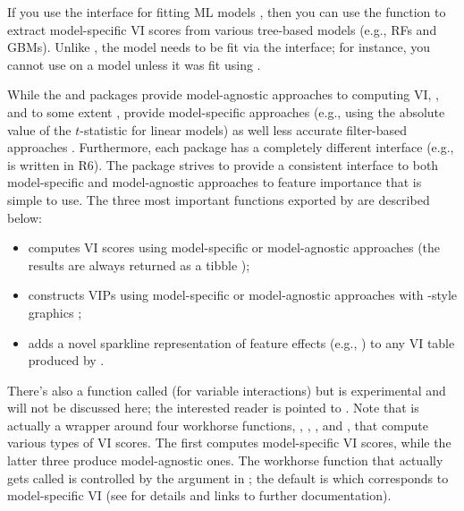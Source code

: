If you use the  interface for fitting ML models \citep{mlr-pkg}, then you can use the  function to extract model-specific VI scores from various tree-based models (e.g., RFs and GBMs). Unlike , the model needs to be fit via the  interface; for instance, you cannot use  on a  model \citep{gbm-pkg} unless it was fit using .

While the  and  packages provide model-agnostic approaches to computing VI, , and to some extent , provide model-specific approaches (e.g., using the absolute value of the $t$-statistic for linear models) as well less accurate filter-based approaches . Furthermore, each package has a completely different interface (e.g.,  is written in R6). The  package \citep{vip-pkg} strives to provide a consistent interface to both model-specific and model-agnostic approaches to feature importance that is simple to use. The three most important functions exported by  are described below:

\begin{itemize}
 
  \item {} computes VI scores using model-specific or model-agnostic approaches (the results are always returned as a tibble \citep{tibble-pkg});
  
  \item {} constructs VIPs using model-specific or model-agnostic approaches with -style graphics \citep{ggplot2-pkg};
  
  \item {} adds a novel sparkline representation of feature effects (e.g., ) to any VI table produced by .

\end{itemize}

There's also a function called  (for variable interactions) but is experimental and will not be discussed here; the interested reader is pointed to \citet{greenwell-simple-2018}. Note that  is actually a wrapper around four workhorse functions, , , , and , that compute various types of VI scores. The first computes model-specific VI scores, while the latter three produce model-agnostic ones. The workhorse function that actually gets called is controlled by the  argument in ; the default is  which corresponds to model-specific VI (see  for details and links to further documentation). 


